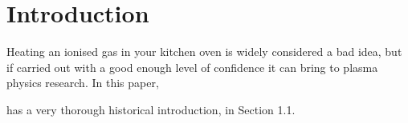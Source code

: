 \section{Introduction}
Heating an ionised gas in your kitchen oven is widely considered a bad idea, but if carried out with a good enough level of confidence it can bring to plasma physics research.
In this paper,

\cite{piel_plasma_2017} has a very thorough historical introduction, in Section 1.1.
